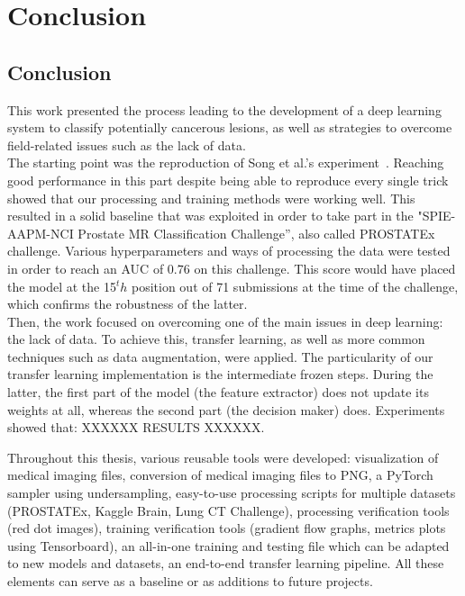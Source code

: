 
\chapter{Conclusion}
\label{ch:conclusions}

\section{Conclusion}
This work presented the process leading to the development of a deep learning system to classify potentially cancerous lesions, as well as strategies to overcome field-related issues such as the lack of data.\\
The starting point was the reproduction of Song et al.'s experiment~\cite{07}. Reaching good performance in this part despite being able to reproduce every single trick showed that our processing and training methods were working well. This resulted in a solid baseline that was exploited in order to take part in the "SPIE-AAPM-NCI Prostate MR Classification Challenge”, also called PROSTATEx challenge. Various hyperparameters and ways of processing the data were tested in order to reach an AUC of $0.76$ on this challenge. This score would have placed the model at the 15$^th$ position out of 71 submissions at the time of the challenge, which confirms the robustness of the latter.  \\
Then, the work focused on overcoming one of the main issues in deep learning: the lack of data. To achieve this, transfer learning, as well as more common techniques such as data augmentation, were applied. The particularity of our transfer learning implementation is the intermediate frozen steps. During the latter, the first part of the model (the feature extractor) does not update its weights at all, whereas the second part (the decision maker) does. Experiments showed that: XXXXXX RESULTS XXXXXX.

Throughout this thesis, various reusable tools were developed: visualization of medical imaging files, conversion of medical imaging files to PNG, a PyTorch sampler using undersampling, easy-to-use processing scripts for multiple datasets (PROSTATEx, Kaggle Brain, Lung CT Challenge), processing verification tools (red dot images), training verification tools (gradient flow graphs, metrics plots using Tensorboard), an all-in-one training and testing file which can be adapted to new models and datasets, an end-to-end transfer learning pipeline. All these elements can serve as a baseline or as additions to future projects. 

